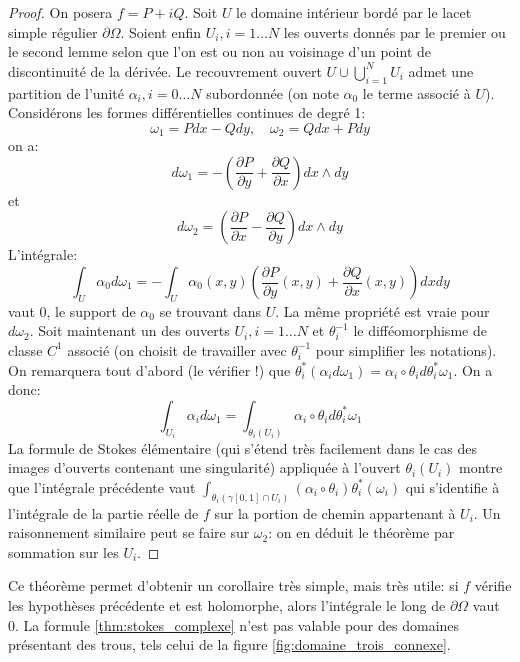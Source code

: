 \begin{proof}
On posera $f = P + i Q$. Soit $U$ le domaine intérieur bordé par le lacet simple régulier $\partial \Omega$. Soient enfin $U_i, i=1\dots N$ les ouverts
donnés par le premier ou le second lemme selon que l'on est ou non au voisinage
d'un point de discontinuité de la dérivée. Le recouvrement ouvert $U \cup
\bigcup_{i=1}^N U_i$ admet une partition de l'unité $\alpha_i, i=0\dots N$ subordonnée 
(on note $\alpha_0$ le terme associé à $U$). Considérons les formes différentielles continues de
degré 1:
\[
\omega_1 = P dx - Q dy, \quad \omega_2= Qdx + Pdy 
\]
on a:
\[
d\omega_1 = -\left(\frac{\partial P}{\partial y}+\frac{\partial Q}{\partial
x}\right )dx \wedge dy
\]
et
\[
d\omega_2 = \left(\frac{\partial P}{\partial x}-\frac{\partial Q}{\partial
y}\right )dx \wedge dy
\]
L'intégrale:
\[
\int_{U} \alpha_0 d\omega_1 = - \int_{U}\alpha_0(x,y) \left(\frac{\partial
P}{\partial y}(x,y)+\frac{\partial Q}{\partial x}(x,y)\right )dxdy
\]
vaut $0$, le support de $\alpha_0$ se trouvant dans $U$. La même propriété
est vraie pour $d\omega_2$. Soit maintenant un des ouverts $U_i, i=1\dots N$ et
$\theta_i^{-1}$ le difféomorphisme de classe $C^1$ associé (on choisit de
travailler avec $\theta_i^{-1}$ pour simplifier les notations). On remarquera
tout d'abord (le vérifier !) que $\theta_i^*\left(\alpha_i d \omega_1\right) =
\alpha_i\circ \theta_i d \theta_i^* \omega_1$. On a donc:
\[
\int_{U_i} \alpha_i d \omega_1  = \int_{\theta_i(U_i)} \alpha_i\circ \theta_i d
\theta_i^* \omega_1
\]
La formule de Stokes élémentaire (qui s’étend très facilement dans le
cas des images d'ouverts contenant une singularité) appliquée à l'ouvert
$\theta_i(U_i)$ montre que l'intégrale précédente vaut $\int_{\theta_i(\gamma[0,1]\cap U_i)} 
\left (\alpha_i \circ \theta_i\right) \theta_i^*(\omega_i)$ qui s'identifie à
l'intégrale de la partie réelle de $f$ sur la portion de chemin appartenant à
$U_i$. Un raisonnement similaire peut se faire sur $\omega_2$: on en déduit le
théorème par sommation sur les $U_i$.
\end{proof}
Ce théorème permet d'obtenir un corollaire très simple, mais très utile: si $f$
vérifie les hypothèses précédente et est holomorphe, alors l'intégrale le long
de $\partial \Omega$ vaut 0. 
La formule \ref{thm:stokes_complexe} n'est pas valable pour des domaines présentant des trous, tels celui de la figure \ref{fig:domaine_trois_connexe}.
